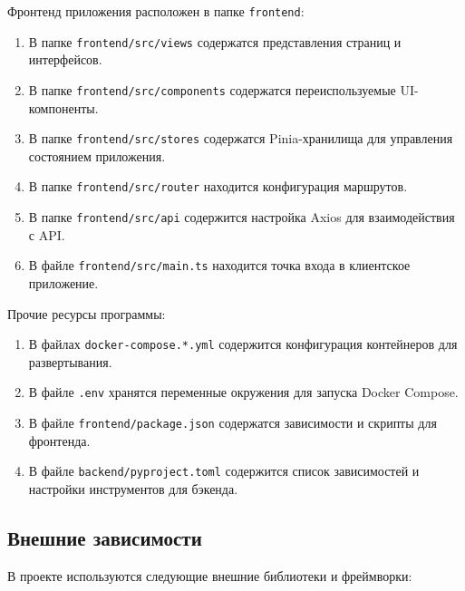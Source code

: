 \documentclass[a4paper,12pt,reqno]{article}
\begin{document}
    Фронтенд приложения расположен в папке \texttt{frontend}:

    \begin{enumerate}
        \item В папке \texttt{frontend/src/views} содержатся представления страниц и интерфейсов.
        \item В папке \texttt{frontend/src/components} содержатся переиспользуемые UI-компоненты.
        \item В папке \texttt{frontend/src/stores} содержатся Pinia-хранилища для управления состоянием приложения.
        \item В папке \texttt{frontend/src/router} находится конфигурация маршрутов.
        \item В папке \texttt{frontend/src/api} содержится настройка Axios для взаимодействия с API.
        \item В файле \texttt{frontend/src/main.ts} находится точка входа в клиентское приложение.
    \end{enumerate}

    Прочие ресурсы программы:

    \begin{enumerate}
        \item В файлах \texttt{docker-compose.*.yml} содержится конфигурация контейнеров для развертывания.
        \item В файле \texttt{.env} хранятся переменные окружения для запуска Docker Compose.
        \item В файле \texttt{frontend/package.json} содержатся зависимости и скрипты для фронтенда.
        \item В файле \texttt{backend/pyproject.toml} содержится список зависимостей и настройки инструментов для бэкенда.
    \end{enumerate}

    \newpage
    
    \subsection*{Внешние зависимости}
    
    В проекте используются следующие внешние библиотеки и фреймворки:
    
\end{document}
